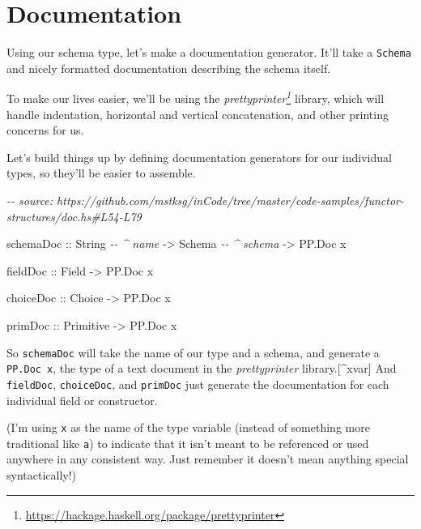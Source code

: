 \documentclass[]{article}
\newenvironment{Shaded}{}{}
\newcommand{\CommentTok}[1]{\textcolor[rgb]{0.38,0.63,0.69}{\textit{#1}}}
\newcommand{\DataTypeTok}[1]{\textcolor[rgb]{0.56,0.13,0.00}{#1}}
\newcommand{\NormalTok}[1]{#1}
\newcommand{\OtherTok}[1]{\textcolor[rgb]{0.00,0.44,0.13}{#1}}
\renewcommand{\href}[2]{#2\footnote{\url{#1}}}
\begin{document}
\hypertarget{documentation}{%
\section{Documentation}\label{documentation}}

Using our schema type, let's make a documentation generator. It'll take a
\texttt{Schema} and nicely formatted documentation describing the schema itself.

To make our lives easier, we'll be using the
\emph{\href{https://hackage.haskell.org/package/prettyprinter}{prettyprinter}}
library, which will handle indentation, horizontal and vertical concatenation,
and other printing concerns for us.

Let's build things up by defining documentation generators for our individual
types, so they'll be easier to assemble.

\begin{Shaded}
\begin{Highlighting}[]
\CommentTok{{-}{-} source: https://github.com/mstksg/inCode/tree/master/code{-}samples/functor{-}structures/doc.hs\#L54{-}L79}

\NormalTok{schemaDoc}
\OtherTok{    ::} \DataTypeTok{String}       \CommentTok{{-}{-} \^{} name}
    \OtherTok{{-}>} \DataTypeTok{Schema}       \CommentTok{{-}{-} \^{} schema}
    \OtherTok{{-}>} \DataTypeTok{PP.Doc}\NormalTok{ x}

\OtherTok{fieldDoc ::} \DataTypeTok{Field} \OtherTok{{-}>} \DataTypeTok{PP.Doc}\NormalTok{ x}

\OtherTok{choiceDoc ::} \DataTypeTok{Choice} \OtherTok{{-}>} \DataTypeTok{PP.Doc}\NormalTok{ x}

\OtherTok{primDoc ::} \DataTypeTok{Primitive} \OtherTok{{-}>} \DataTypeTok{PP.Doc}\NormalTok{ x}
\end{Highlighting}
\end{Shaded}

So \texttt{schemaDoc} will take the name of our type and a schema, and generate
a \texttt{PP.Doc\ x}, the type of a text document in the \emph{prettyprinter}
library.{[}\^{}xvar{]} And \texttt{fieldDoc}, \texttt{choiceDoc}, and
\texttt{primDoc} just generate the documentation for each individual field or
constructor.

(I'm using \texttt{x} as the name of the type variable (instead of something
more traditional like \texttt{a}) to indicate that it isn't meant to be
referenced or used anywhere in any consistent way. Just remember it doesn't mean
anything special syntactically!)
\end{document}
